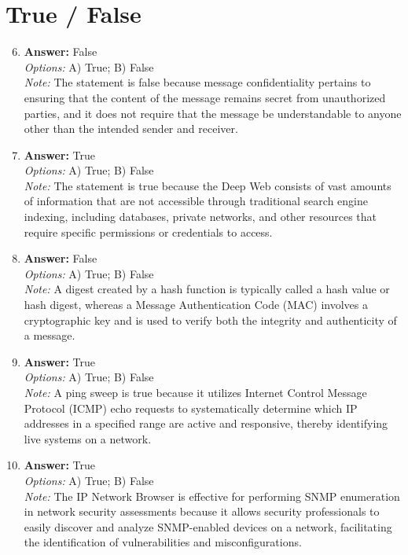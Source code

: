 \documentclass[12pt]{article}
\begin{document}
\section*{True / False}
\begin{enumerate}[label=\arabic*.]
\setcounter{enumi}{5}
\item \textbf{Answer:} False
\\ \textit{Options:} A) True; B) False
\\ \textit{Note:} The statement is false because message confidentiality pertains to ensuring that the content of the message remains secret from unauthorized parties, and it does not require that the message be understandable to anyone other than the intended sender and receiver.
\item \textbf{Answer:} True
\\ \textit{Options:} A) True; B) False
\\ \textit{Note:} The statement is true because the Deep Web consists of vast amounts of information that are not accessible through traditional search engine indexing, including databases, private networks, and other resources that require specific permissions or credentials to access.
\item \textbf{Answer:} False
\\ \textit{Options:} A) True; B) False
\\ \textit{Note:} A digest created by a hash function is typically called a hash value or hash digest, whereas a Message Authentication Code (MAC) involves a cryptographic key and is used to verify both the integrity and authenticity of a message.
\item \textbf{Answer:} True
\\ \textit{Options:} A) True; B) False
\\ \textit{Note:} A ping sweep is true because it utilizes Internet Control Message Protocol (ICMP) echo requests to systematically determine which IP addresses in a specified range are active and responsive, thereby identifying live systems on a network.
\item \textbf{Answer:} True
\\ \textit{Options:} A) True; B) False
\\ \textit{Note:} The IP Network Browser is effective for performing SNMP enumeration in network security assessments because it allows security professionals to easily discover and analyze SNMP-enabled devices on a network, facilitating the identification of vulnerabilities and misconfigurations.
\end{enumerate}
\end{document}
